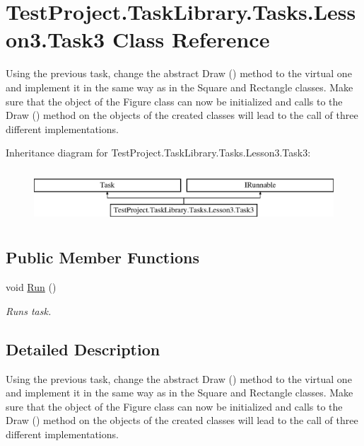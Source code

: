 \hypertarget{class_test_project_1_1_task_library_1_1_tasks_1_1_lesson3_1_1_task3}{}\section{Test\+Project.\+Task\+Library.\+Tasks.\+Lesson3.\+Task3 Class Reference}
\label{class_test_project_1_1_task_library_1_1_tasks_1_1_lesson3_1_1_task3}


Using the previous task, change the abstract Draw () method to the virtual one and implement it in the same way as in the Square and Rectangle classes. Make sure that the object of the Figure class can now be initialized and calls to the Draw () method on the objects of the created classes will lead to the call of three different implementations.  


Inheritance diagram for Test\+Project.\+Task\+Library.\+Tasks.\+Lesson3.\+Task3\+:\begin{figure}[H]
\begin{center}
\leavevmode
\includegraphics[height=2.000000cm]{class_test_project_1_1_task_library_1_1_tasks_1_1_lesson3_1_1_task3}
\end{center}
\end{figure}
\subsection*{Public Member Functions}
\begin{DoxyCompactItemize}
\item 
void \mbox{\hyperlink{class_test_project_1_1_task_library_1_1_tasks_1_1_lesson3_1_1_task3_a5248179445bdea7c7b3e6d8d03e96d2c}{Run}} ()
\begin{DoxyCompactList}\small\item\em Runs task. \end{DoxyCompactList}\end{DoxyCompactItemize}


\subsection{Detailed Description}
Using the previous task, change the abstract Draw () method to the virtual one and implement it in the same way as in the Square and Rectangle classes. Make sure that the object of the Figure class can now be initialized and calls to the Draw () method on the objects of the created classes will lead to the call of three different implementations. 



